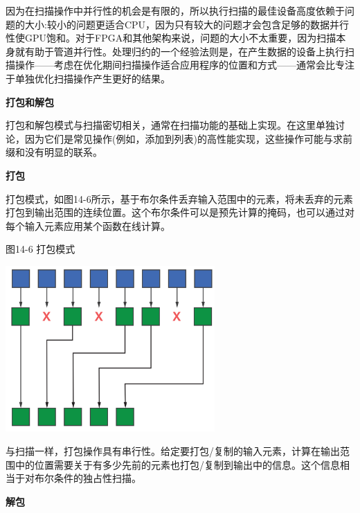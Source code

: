 因为在扫描操作中并行性的机会是有限的，所以执行扫描的最佳设备高度依赖于问题的大小:较小的问题更适合CPU，因为只有较大的问题才会包含足够的数据并行性使GPU饱和。对于FPGA和其他架构来说，问题的大小不太重要，因为扫描本身就有助于管道并行性。处理归约的一个经验法则是，在产生数据的设备上执行扫描操作——考虑在优化期间扫描操作适合应用程序的位置和方式——通常会比专注于单独优化扫描操作产生更好的结果。\par

\hspace*{\fill} \par %
\textbf{打包和解包}

打包和解包模式与扫描密切相关，通常在扫描功能的基础上实现。在这里单独讨论，因为它们是常见操作(例如，添加到列表)的高性能实现，这些操作可能与求前缀和没有明显的联系。\par

\hspace*{\fill} \par %
\textbf{打包}

打包模式，如图14-6所示，基于布尔条件丢弃输入范围中的元素，将未丢弃的元素打包到输出范围的连续位置。这个布尔条件可以是预先计算的掩码，也可以通过对每个输入元素应用某个函数在线计算。\par

\hspace*{\fill} \par %
图14-6 打包模式
\begin{center}
	\includegraphics[width=0.6\textwidth]{content/chapter-14/images/6}
\end{center}

与扫描一样，打包操作具有串行性。给定要打包/复制的输入元素，计算在输出范围中的位置需要关于有多少先前的元素也打包/复制到输出中的信息。这个信息相当于对布尔条件的独占性扫描。\par

\hspace*{\fill} \par %
\textbf{解包}

